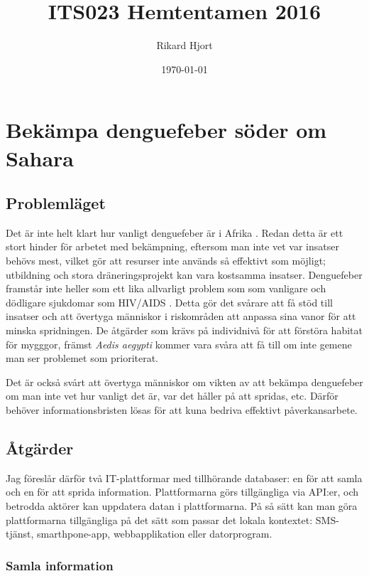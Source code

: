 \documentclass{article}
\title{ITS023 Hemtentamen 2016}
\date{\today}
\author{Rikard Hjort}
\begin{document}
\maketitle

\section{Bekämpa denguefeber söder om Sahara}

\subsection{Problemläget}

Det är inte helt klart hur vanligt denguefeber är i Afrika . Redan detta är ett stort hinder för arbetet med bekämpning, eftersom man inte vet var insatser behövs mest, vilket gör att resurser inte används så effektivt som möjligt; utbildning och stora dräneringsprojekt kan vara kostsamma insatser. Denguefeber framstår inte heller som ett lika allvarligt problem som som vanligare och dödligare sjukdomar som HIV/AIDS . Detta gör det svårare att få stöd till insatser och att övertyga människor i riskområden att anpassa sina vanor för att minska spridningen. De åtgärder som krävs på individnivå för att förstöra habitat för mygggor, främst \emph{Aedis aegypti}  kommer vara svåra att få till om inte gemene man ser problemet som prioriterat.

Det är också svårt att övertyga människor om vikten av att bekämpa denguefeber om man inte vet hur vanligt det är, var det håller på att spridas, etc. Därför behöver informationsbristen lösas för att kuna bedriva effektivt påverkansarbete.

\subsection{Åtgärder}

Jag föreslår därför två IT-plattformar med tillhörande databaser: en för att samla och en för att sprida information. Plattformarna görs tillgängliga via API:er, och betrodda aktörer kan uppdatera datan i plattformarna. På så sätt kan man göra plattformarna tillgängliga på det sätt som passar det lokala kontextet: SMS-tjänst, smarthpone-app, webbapplikation eller datorprogram.

\subsubsection{Samla information}
\end{document}
